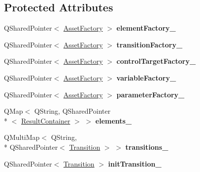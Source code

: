 \subsection*{Protected Attributes}
\begin{DoxyCompactItemize}
\item 
\hypertarget{class_picto_1_1_machine_container_ac682abf8e80e278e573ee94bc9040fbf}{Q\-Shared\-Pointer$<$ \hyperlink{class_picto_1_1_asset_factory}{Asset\-Factory} $>$ {\bfseries element\-Factory\-\_\-}}\label{class_picto_1_1_machine_container_ac682abf8e80e278e573ee94bc9040fbf}

\item 
\hypertarget{class_picto_1_1_machine_container_af556da8e06839e3c6e769dd2cb2b446e}{Q\-Shared\-Pointer$<$ \hyperlink{class_picto_1_1_asset_factory}{Asset\-Factory} $>$ {\bfseries transition\-Factory\-\_\-}}\label{class_picto_1_1_machine_container_af556da8e06839e3c6e769dd2cb2b446e}

\item 
\hypertarget{class_picto_1_1_machine_container_ab969ca5f54fdbe7dbc79058f9b506f17}{Q\-Shared\-Pointer$<$ \hyperlink{class_picto_1_1_asset_factory}{Asset\-Factory} $>$ {\bfseries control\-Target\-Factory\-\_\-}}\label{class_picto_1_1_machine_container_ab969ca5f54fdbe7dbc79058f9b506f17}

\item 
\hypertarget{class_picto_1_1_machine_container_a32dd054332e81c34234a040c3354503c}{Q\-Shared\-Pointer$<$ \hyperlink{class_picto_1_1_asset_factory}{Asset\-Factory} $>$ {\bfseries variable\-Factory\-\_\-}}\label{class_picto_1_1_machine_container_a32dd054332e81c34234a040c3354503c}

\item 
\hypertarget{class_picto_1_1_machine_container_a5a019bf4ec4a03be905c57ecfbb63dc3}{Q\-Shared\-Pointer$<$ \hyperlink{class_picto_1_1_asset_factory}{Asset\-Factory} $>$ {\bfseries parameter\-Factory\-\_\-}}\label{class_picto_1_1_machine_container_a5a019bf4ec4a03be905c57ecfbb63dc3}

\item 
\hypertarget{class_picto_1_1_machine_container_afe9ce7f50195f0bd65fe776f71b6ad03}{Q\-Map$<$ Q\-String, Q\-Shared\-Pointer\\*
$<$ \hyperlink{class_picto_1_1_result_container}{Result\-Container} $>$ $>$ {\bfseries elements\-\_\-}}\label{class_picto_1_1_machine_container_afe9ce7f50195f0bd65fe776f71b6ad03}

\item 
\hypertarget{class_picto_1_1_machine_container_a396a1b9e009a6482ef73971c36ca3582}{Q\-Multi\-Map$<$ Q\-String, \\*
Q\-Shared\-Pointer$<$ \hyperlink{class_picto_1_1_transition}{Transition} $>$ $>$ {\bfseries transitions\-\_\-}}\label{class_picto_1_1_machine_container_a396a1b9e009a6482ef73971c36ca3582}

\item 
\hypertarget{class_picto_1_1_machine_container_aad1523c8eb419361bcb3a1fab4c48096}{Q\-Shared\-Pointer$<$ \hyperlink{class_picto_1_1_transition}{Transition} $>$ {\bfseries init\-Transition\-\_\-}}\label{class_picto_1_1_machine_container_aad1523c8eb419361bcb3a1fab4c48096}

\end{DoxyCompactItemize}
